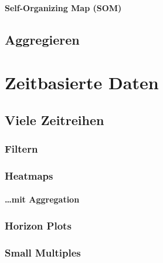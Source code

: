                \paragraph{Self-Organizing Map (SOM)} %

        \subsection{Aggregieren} %

    \section{Zeitbasierte Daten} %

        \subsection{Viele Zeitreihen} %

            \subsubsection{Filtern} %

            \subsubsection{Heatmaps} %

                \paragraph{\dots mit Aggregation} %

            \subsubsection{Horizon Plots} %

            \subsubsection{Small Multiples} %

